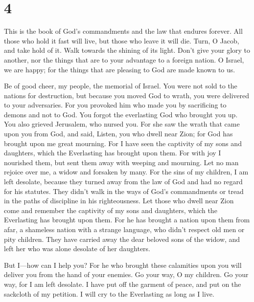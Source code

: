 \hypertarget{section-3}{%
\section{4}\label{section-3}}

 This is the book of God's commandments and the law that
endures forever. All those who hold it fast will live, but those who
leave it will die.  Turn, O Jacob, and take hold of it. Walk
towards the shining of its light.  Don't give your glory to
another, nor the things that are to your advantage to a foreign nation.
 O Israel, we are happy; for the things that are pleasing to
God are made known to us.

 Be of good cheer, my people, the memorial of Israel.
 You were not sold to the nations for destruction, but
because you moved God to wrath, you were delivered to your adversaries.
 For you provoked him who made you by sacrificing to demons
and not to God.  You forgot the everlasting God who brought
you up. You also grieved Jerusalem, who nursed you.  For she
saw the wrath that came upon you from God, and said, Listen, you who
dwell near Zion; for God has brought upon me great mourning.
 For I have seen the captivity of my sons and daughters,
which the Everlasting has brought upon them.  For with joy
I nourished them, but sent them away with weeping and mourning.
 Let no man rejoice over me, a widow and forsaken by many.
For the sins of my children, I am left desolate, because they turned
away from the law of God  and had no regard for his
statutes. They didn't walk in the ways of God's commandments or tread in
the paths of discipline in his righteousness.  Let those
who dwell near Zion come and remember the captivity of my sons and
daughters, which the Everlasting has brought upon them. 
For he has brought a nation upon them from afar, a shameless nation with
a strange language, who didn't respect old men or pity children.
 They have carried away the dear beloved sons of the widow,
and left her who was alone desolate of her daughters.

 But I---how can I help you?  For he who
brought these calamities upon you will deliver you from the hand of your
enemies.  Go your way, O my children. Go your way, for I am
left desolate.  I have put off the garment of peace, and
put on the sackcloth of my petition. I will cry to the Everlasting as
long as I live.

